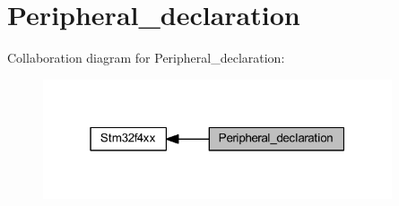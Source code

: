 \hypertarget{group___peripheral__declaration}{}\section{Peripheral\+\_\+declaration}
\label{group___peripheral__declaration}
Collaboration diagram for Peripheral\+\_\+declaration\+:
\nopagebreak
\begin{figure}[H]
\begin{center}
\leavevmode
\includegraphics[width=292pt]{group___peripheral__declaration}
\end{center}
\end{figure}
